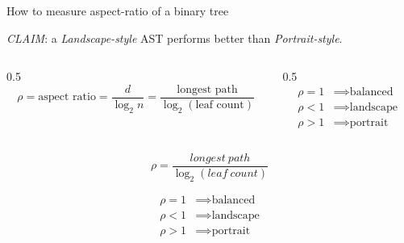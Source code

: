 \begin{frame}{How to measure aspect-ratio of a binary tree}

  \emph{CLAIM}: a \emph{Landscape-style} AST performs better than \emph{Portrait-style}.


  \scalebox{1.1}{}
  \vspace{-8mm}
  \begin{columns}
    \begin{column}{0.5\textwidth}
      \[\rho = \text{aspect ratio} = \frac{d}{\log_2 n} = \frac{\text{longest path}}{\log_2(\text{leaf count})}\]      
    \end{column}
    \begin{column}{0.5\textwidth}
    \begin{align*}
      \rho = 1 & \implies \text{balanced}\\
      \rho < 1 & \implies \text{landscape}\\
      \rho > 1 & \implies \text{portrait}
    \end{align*}
    \end{column}
  \end{columns}

\end{frame}




\newsavebox\arbox
\begin{lrbox}{\arbox}
  \begin{minipage}{4cm}
    \[\rho = \frac{longest~path}{\log_2(leaf~count)}\]

    \begin{align*}
      \rho = 1 & \implies \text{balanced}\\
      \rho < 1 & \implies \text{landscape}\\
      \rho > 1 & \implies \text{portrait}
    \end{align*}
  \end{minipage}
\end{lrbox}

